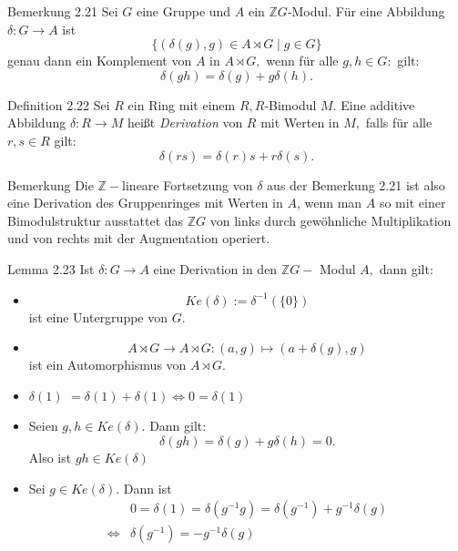 \documentclass{beamer}
\begin{document}
\begin{frame}
\begin{block}{Bemerkung 2.21}
Sei $G$ eine Gruppe und $A$ ein $\mathbb{Z}G$-Modul. Für eine Abbildung $\delta:G\to A$ ist 
\[
\{(\delta(g),g)\in A\rtimes G \mid g\in G\}
\]
genau dann ein Komplement von $A$ in $A \rtimes G,$ wenn für alle $g,h\in G:$ gilt:
\[
\delta(gh)=\delta(g)+g\delta(h).
\]
\end{block}
\end{frame}
\begin{frame}
\begin{block}{Definition 2.22}
Sei $R$ ein Ring mit einem $R,R$-Bimodul $M.$ Eine additive Abbildung $\delta:R\to M$ heißt \emph{Derivation} von $R$ mit Werten in $M,$ falls für alle $r,s\in R$ gilt:
\[
\delta(rs)=\delta(r)s+r\delta(s).
\]
\end{block}
\end{frame}
\begin{frame}
\begin{block}{Bemerkung}
Die $\mathbb{Z}-$lineare Fortsetzung von $\delta$ aus der Bemerkung 2.21 ist also eine Derivation des Gruppenringes mit Werten in $A$, wenn man $A$ so mit einer Bimodulstruktur ausstattet das $\mathbb{Z}G$ von links durch gewöhnliche Multiplikation und von rechts mit der Augmentation operiert. 
\end{block}
\end{frame}
\begin{frame}
\begin{block}{Lemma 2.23}
Ist $\delta:G\to A$ eine Derivation in den $\mathbb{Z}G-$ Modul $A,$ dann gilt:
\begin{itemize}
\item \[
Ke(\delta):=\delta^{-1}(\{0\})
\]
ist eine Untergruppe von $G.$
\item 
\[
A\rtimes G\to A\rtimes G: (a,g)\mapsto (a+\delta(g),g)
\]
ist ein Automorphismus von $A\rtimes G.$
\end{itemize}
\end{block}
\end{frame}
\begin{frame}
\begin{itemize}
\item $\delta(1)$ \pause $=\delta(1)+\delta(1)$\pause $\Leftrightarrow 0=\delta(1)$\pause 
\item Seien $g,h\in Ke(\delta).$ \pause Dann gilt:
\[
\delta(gh)=\delta(g)+g\delta(h)=0.
\]
\pause 
Also ist $gh\in Ke(\delta)$\pause
\item Sei $g\in Ke(\delta).$ \pause Dann ist\pause  
\begin{align*}
&0=\delta(1)=\delta(g^{-1}g)=\delta(g^{-1})+g^{-1}\delta(g)\\
\Leftrightarrow &\delta(g^{-1})=-g^{-1}\delta(g)
\end{align*}
\end{itemize}
\end{frame}
\end{document}
